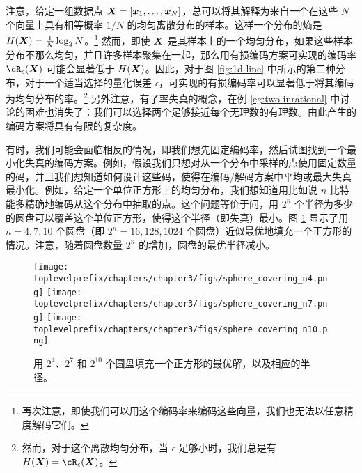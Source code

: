 \documentclass[../../book-main_zh.tex]{subfiles}
\begin{document}
\begin{remark}
	注意，给定一组数据点 $\bm{X} = [\bm{x}_1,\ldots, \bm{x}_N]$，总可以将其解释为来自一个在这些 $N$ 个向量上具有相等概率 $1/N$ 的均匀离散分布的样本。这样一个分布的熵是 $H(\bm{X}) = \frac{1}{N}\log_2 N$。\footnote{再次注意，即使我们可以用这个编码率来编码这些向量，我们也无法以任意精度解码它们。} 然而，即使 $\bm{X}$ 是其样本上的一个均匀分布，如果这些样本分布不那么均匀，并且许多样本聚集在一起，那么用有损编码方案可实现的编码率 $\cR_{\epsilon}(\X)$ 可能会显著低于 $H(\bm{X})$。因此，对于图 \ref{fig:1d-line} 中所示的第二种分布，对于一个适当选择的量化误差 $\epsilon$，可实现的有损编码率可以显著低于将其编码为均匀分布的率。\footnote{然而，对于这个离散均匀分布，当 $\epsilon$ 足够小时，我们总是有 $H(\X) = \cR_{\epsilon}(\X)$。} 另外注意，有了率失真的概念，在例 \ref{eg:two-inrational} 中讨论的困难也消失了：我们可以选择两个足够接近每个无理数的有理数。由此产生的编码方案将具有有限的复杂度。
\end{remark}

\begin{example}\label{example:sphere-covering-rate-distortion}
	有时，我们可能会面临相反的情况，即我们想先固定编码率，然后试图找到一个最小化失真的编码方案。例如，假设我们只想对从一个分布中采样的点使用固定数量的码，并且我们想知道如何设计这些码，使得在编码/解码方案中平均或最大失真最小化。例如，给定一个单位正方形上的均匀分布，我们想知道用比如说 $n$ 比特能多精确地编码从这个分布中抽取的点。这个问题等价于问，用 $2^n$ 个半径为多少的圆盘可以覆盖这个单位正方形，使得这个半径（即失真）最小。图 \ref{fig:seven-circles-packing} 显示了用 \(n = 4, 7, 10\) 个圆盘（即 \(2^{n} = 16, 128, 1024\) 个圆盘）近似最优地填充一个正方形的情况。注意，随着圆盘数量 \(2^{n}\) 的增加，圆盘的最优半径减小。
	\begin{figure}
		\centering
		\texttt{[image: \\toplevelprefix/chapters/chapter3/figs/sphere\_covering\_n4.png]}
		\hfill
		\texttt{[image: \\toplevelprefix/chapters/chapter3/figs/sphere\_covering\_n7.png]}
		\hfill
		\texttt{[image: \\toplevelprefix/chapters/chapter3/figs/sphere\_covering\_n10.png]}

		\caption{用 \(2^{4}\)、\(2^{7}\) 和 \(2^{10}\) 个圆盘填充一个正方形的最优解，以及相应的半径。}
		\label{fig:seven-circles-packing}
	\end{figure}

\end{example}
\end{document}
